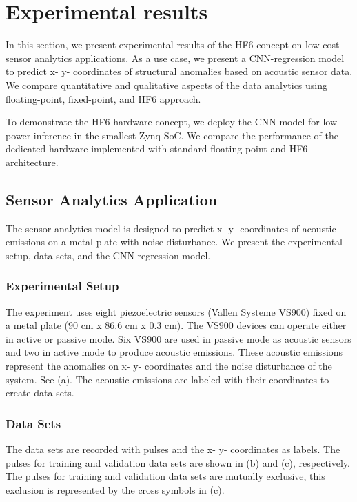 \section{Experimental results}
\label{sec:experimental_results}
In this section, we present experimental results of the HF6 concept on low-cost sensor analytics applications. As a use case, we present a CNN-regression model to predict x- y- coordinates of structural anomalies based on acoustic sensor data. We compare quantitative and qualitative aspects of the data analytics using floating-point, fixed-point, and HF6 approach.

To demonstrate the HF6 hardware concept, we deploy the CNN model for low-power inference in the smallest Zynq SoC. We compare the performance of the dedicated hardware implemented with standard floating-point and HF6 architecture.

\subsection{Sensor Analytics Application}
The sensor analytics model is designed to predict x- y- coordinates of acoustic emissions on a metal plate with noise disturbance. We present the experimental setup, data sets, and the CNN-regression model.

\subsubsection{Experimental Setup}
The experiment uses eight piezoelectric sensors (Vallen Systeme VS900) fixed on a metal plate (90 cm x 86.6 cm x 0.3 cm). The VS900 devices can operate either in active or passive mode. Six VS900 are used in passive mode as acoustic sensors and two in active mode to produce acoustic emissions. These acoustic emissions represent the anomalies on x- y- coordinates and the noise disturbance of the system. See (a). The acoustic emissions are labeled with their coordinates to create data sets.

\subsubsection{Data Sets}
The data sets are recorded with pulses and the x- y- coordinates as labels. The pulses for training and validation data sets are shown in (b) and (c), respectively. The pulses for training and validation data sets are mutually exclusive, this exclusion is represented by the cross symbols in (c).

